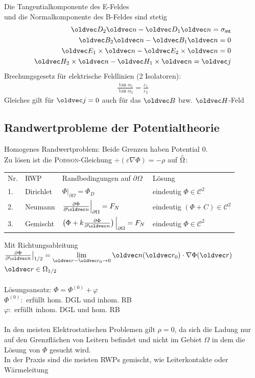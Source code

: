 \documentclass[6pt,a4paper]{scrartcl}
\let\vec\oldvec
\begin{document}
\begin{multicols}{4}
{	Die Tangentialkomponente des E-Feldes\\ und die Normalkomponente des B-Feldes sind stetig
	\begin{eqnarray*}
	\vec D_2 \vec n - \vec D_1 \vec n = \sigma_{\ir int} \\
			\vec B_2 \vec n - \vec B_1 \vec n = 0 \\
			\vec E_1 \times \vec n - \vec E_2 \times \vec n = 0 \\
			\vec H_2 \times \vec n - \vec H_1 \times \vec n = \vec j
	\end{eqnarray*}
	Brechungsgesetz für elektrische Feldlinien (2 Isolatoren): \\
	\begin{eqnarray*}
		\frac{\tan \alpha_1}{\tan \alpha_2} = \frac{\varepsilon_1}{\varepsilon_2}
	\end{eqnarray*}
	Gleiches gilt für $\vec j = 0$ auch für das $\vec B$ bzw. $\vec H$-Feld
	}
	\columnbreak
	\subsection{Randwertprobleme der Potentialtheorie}
	Homogenes Randwertproblem: Beide Grenzen haben Potential 0.\\
	Zu lösen ist die \textsc{Poisson}-Gleichung $\div(\varepsilon \nabla \Phi) = -\rho$ auf $\overset{{}_\circ}{\Omega}$:\\
	\begin{tabular*}{\columnwidth}{@{\extracolsep\fill}llll@{}}
	Nr. & RWP & Randbedingungen auf $\partial \Omega$ & Lösung\\
	1. & Dirichlet & $\Phi\big|_{\partial\Omega} = \Phi_D$ & eindeutig $\Phi \in \mathcal C^2$\\[0.5em]
	2. & Neumann & $\frac{\partial \Phi}{\partial \vec n}\Big|_{\partial\Omega} = F_N$ & eindeutig $(\Phi + C) \in \mathcal C^2$\\[0.5em]
	3. & Gemischt & $\left( \Phi + k \frac{\partial \Phi}{\partial \vec n}\right)\Big|_{\partial\Omega} = F_N$ & eindeutig $\Phi \in \mathcal C^2$\\
	\end{tabular*} 
	Mit Richtungsableitung $\frac{\partial \Phi}{\partial \vec n}\big|_{1/2} = \lim\limits_{\vec r - \vec r_0 \ra 0} \vec n(\vec r_0) \cdot \nabla\Phi(\vec r)$ \quad $\vec r \in \Omega_{1/2}$\\
	\\
	Lösungsansatz: $\Phi = \Phi^{(0)} + \varphi$\\
	$\Phi^{(0)}:$ erfüllt hom. DGL und inhom. RB\\
	$\varphi:$ erfüllt inhom. DGL und hom. RB\\
	\\
	In den meisten Elektrostatischen Problemen gilt $\rho = 0$, da sich die Ladung nur auf den Grenzflächen von Leitern befindet und nicht im Gebiet $\Omega$ in dem die Lösung von $\Phi$ gesucht wird.\\
	In der Praxis sind die meisten RWPs gemischt, wie Leiterkontakte oder Wärmeleitung\\ 
	

\end{multicols}
\end{document}
